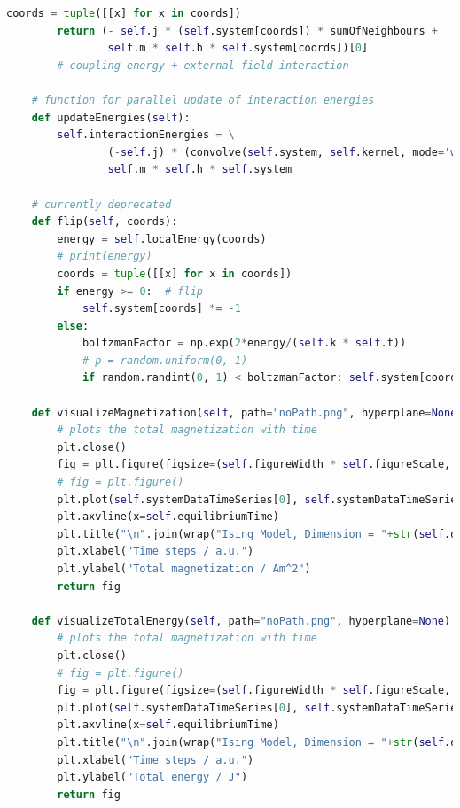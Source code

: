 \documentclass[%
showkeys,
bibnotes,
amsmath,amssymb,
floatfix,
]{revtex4-1}
\begin{document}
\begin{lstlisting}[language=Python]
        coords = tuple([[x] for x in coords])
        return (- self.j * (self.system[coords]) * sumOfNeighbours +
                self.m * self.h * self.system[coords])[0]
        # coupling energy + external field interaction

    # function for parallel update of interaction energies
    def updateEnergies(self):
        self.interactionEnergies = \
                (-self.j) * (convolve(self.system, self.kernel, mode='wrap') - self.system) * self.system + \
                self.m * self.h * self.system

    # currently deprecated
    def flip(self, coords):
        energy = self.localEnergy(coords)
        # print(energy)
        coords = tuple([[x] for x in coords])
        if energy >= 0:  # flip
            self.system[coords] *= -1
        else:
            boltzmanFactor = np.exp(2*energy/(self.k * self.t))
            # p = random.uniform(0, 1)
            if random.randint(0, 1) < boltzmanFactor: self.system[coords] = -self.system[coords]

    def visualizeMagnetization(self, path="noPath.png", hyperplane=None):
        # plots the total magnetization with time
        plt.close()
        fig = plt.figure(figsize=(self.figureWidth * self.figureScale, self.figureHeight * self.figureScale), dpi=self.figureDpi)
        # fig = plt.figure()
        plt.plot(self.systemDataTimeSeries[0], self.systemDataTimeSeries[1], "+k")
        plt.axvline(x=self.equilibriumTime)
        plt.title("\n".join(wrap("Ising Model, Dimension = "+str(self.d)+", N = "+str(self.n)+", Tc = "+str(sigfig.round(float(self.tc), sigfigs=4))+"K, T = "+str(sigfig.round(float(self.t), sigfigs=4)) + "K, Time = "+str(self.timeStep)+"au", 60)))
        plt.xlabel("Time steps / a.u.")
        plt.ylabel("Total magnetization / Am^2")
        return fig

    def visualizeTotalEnergy(self, path="noPath.png", hyperplane=None):
        # plots the total magnetization with time
        plt.close()
        # fig = plt.figure()
        fig = plt.figure(figsize=(self.figureWidth * self.figureScale, self.figureHeight * self.figureScale), dpi=self.figureDpi)
        plt.plot(self.systemDataTimeSeries[0], self.systemDataTimeSeries[2], "+k")
        plt.axvline(x=self.equilibriumTime)
        plt.title("\n".join(wrap("Ising Model, Dimension = "+str(self.d)+", N = "+str(self.n)+", Tc = "+str(sigfig.round(float(self.tc), sigfigs=4))+"K, T = "+str(sigfig.round(float(self.t), sigfigs=4)) + "K, Time = "+str(self.timeStep)+"au", 60)))
        plt.xlabel("Time steps / a.u.")
        plt.ylabel("Total energy / J")
        return fig


\end{lstlisting}
\end{document}
